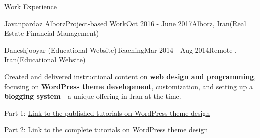 \documentclass[]{kyvernitis-resume}
\begin{document}
\begin{section}{Work Experience}
\begin{subsection}{Javanpardaz Alborz}{Project-based Work}{Oct 2016 - June 2017}{Alborz, Iran}{(Real Estate Financial Management)}
    \end{subsection}


 \begin{subsection}{Daneshjooyar (Educational Website)}{Teaching}{Mar 2014 - Aug 2014}{Remote , Iran}{(Educational Website)}
	\item Created and delivered instructional content on \textbf{web design and programming}, focusing on \textbf{WordPress theme development}, customization, and setting up a \textbf{blogging system}—a unique offering in Iran at the time.
	\item Part 1:  \href{https://www.daneshjooyar.com/%d9%82%d8%b3%d9%85%d8%aa-%d9%86%d9%87%d8%a7%db%8c%db%8c-%d8%b3%d8%b1%db%8c-%d8%a2%d9%85%d9%88%d8%b2%d8%b4%db%8c-%d8%b7%d8%b1%d8%a7%d8%ad%db%8c-%d9%82%d8%a7%d9%84%d8%a8-%d9%88%d8%b1%d8%af%d9%be%d8%b1/}{Link to the published tutorials on WordPress theme design} 
	\item Part 2: \href{https://www.daneshjooyar.com/%d8%a2%d9%85%d9%88%d8%b2%d8%b4-%d8%b7%d8%b1%d8%a7%d8%ad%db%8c-%d9%82%d8%a7%d9%84%d8%a8-%d9%88%d8%b1%d8%af%d9%be%d8%b1%d8%b3-%d8%aa%d9%85%d8%a7%d9%85%db%8c-%d9%82%d8%b3%d9%85%d8%aa-%d9%87%d8%a7-%d9%82/}{Link to the complete tutorials on WordPress theme design}
    \end{subsection}
    
\end{section}
\end{document}
